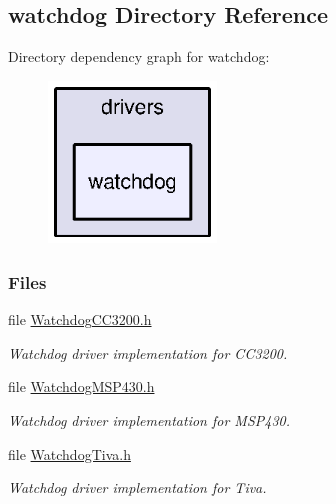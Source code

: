 \subsection{watchdog Directory Reference}
\label{dir_9bca4ecaf396a946ef2bb2a54a92fdaa}
Directory dependency graph for watchdog\-:
\nopagebreak
\begin{figure}[H]
\begin{center}
\leavevmode
\includegraphics[width=127pt]{dir_9bca4ecaf396a946ef2bb2a54a92fdaa_dep}
\end{center}
\end{figure}
\subsubsection*{Files}
\begin{DoxyCompactItemize}
\item 
file \hyperlink{_watchdog_c_c3200_8h}{Watchdog\-C\-C3200.\-h}
\begin{DoxyCompactList}\small\item\em Watchdog driver implementation for C\-C3200. \end{DoxyCompactList}\item 
file \hyperlink{_watchdog_m_s_p430_8h}{Watchdog\-M\-S\-P430.\-h}
\begin{DoxyCompactList}\small\item\em Watchdog driver implementation for M\-S\-P430. \end{DoxyCompactList}\item 
file \hyperlink{_watchdog_tiva_8h}{Watchdog\-Tiva.\-h}
\begin{DoxyCompactList}\small\item\em Watchdog driver implementation for Tiva. \end{DoxyCompactList}\end{DoxyCompactItemize}
